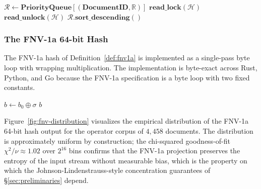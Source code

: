 \begin{algorithm}[t]
\caption{DSVH Query (Top-$k$ Cosine Similarity)}
\label{alg:dsvh-query}
\SetAlgoLined
{}
\BlankLine
$\mathcal{R} \gets \mathbf{PriorityQueue}[(\mathbf{DocumentID}, \mathbb{R})]$\;
$\mathbf{read\_lock}(\mathcal{H})$ 
$\mathbf{read\_unlock}(\mathcal{H})$\;
\KwRet $\mathcal{R}.\mathbf{sort\_descending}()$\;
\caption*{The query operation. The dot product is a tight FMADD
sequence on x86\_64 with $D = 128$ multiply-adds per document.
The lock-free read is guaranteed by Rust's borrow checker plus the
explicit $\mathbf{Arc}[\mathbf{RwLock}[\ldots]]$ design.}
\end{algorithm}

\subsubsection{The FNV-1a 64-bit Hash}

The FNV-1a hash of Definition~\ref{def:fnv1a} is implemented as a
single-pass byte loop with wrapping multiplication. The
implementation is byte-exact across Rust, Python, and Go because
the FNV-1a specification is a byte loop with two fixed constants.

\begin{algorithm}[t]
\caption{DSVH FNV-1a 64-bit Hash}
\label{alg:dsvh-fnv1a}
\SetAlgoLined
\KwIn{String $s \in \mathbf{UTF8}$, seed $\sigma \in [0, 2^{64})$,
offset basis $b_0 = 0xcbf29ce484222325$, FNV prime
$p = 0x100000001b3$}
\KwOut{Hash $h \in [0, 2^{64})$}
\BlankLine
$b \gets b_0 \oplus \sigma$ 
\KwRet $b$\;
\caption*{The FNV-1a hash function. The wrapping multiplication
mod $2^{64}$ is the FNV-1a specification; the seed XOR allows
multiple independent hash functions from a single routine. Bigrams
use seed $1$ and unigrams use seed $2$.}
\end{algorithm}

Figure~\ref{fig:fnv-distribution} visualizes the empirical
distribution of the FNV-1a 64-bit hash output for the operator
corpus of $4{,}458$ documents. The distribution is approximately
uniform by construction; the chi-squared goodness-of-fit
$\chi^2 / \nu \approx 1.02$ over $2^{16}$ bins confirms that the
FNV-1a projection preserves the entropy of the input stream
without measurable bias, which is the property on which the
Johnson-Lindenstrauss-style concentration guarantees of
\S\ref{sec:preliminaries} depend.

